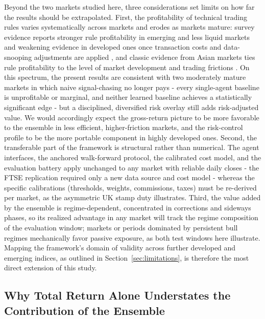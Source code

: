 \documentclass{ieeeaccess}
\begin{document}
Beyond the two markets studied here, three considerations set limits on how far the results should be extrapolated. First, the profitability of technical trading rules varies systematically across markets and erodes as markets mature: survey evidence reports stronger rule profitability in emerging and less liquid markets and weakening evidence in developed ones once transaction costs and data-snooping adjustments are applied \cite{parkirwin2007}, and classic evidence from Asian markets ties rule profitability to the level of market development and trading frictions \cite{bessembinderchan1995}. On this spectrum, the present results are consistent with two moderately mature markets in which naive signal-chasing no longer pays - every single-agent baseline is unprofitable or marginal, and neither learned baseline achieves a statistically significant edge - but a disciplined, diversified risk overlay still adds risk-adjusted value. We would accordingly expect the gross-return picture to be more favorable to the ensemble in less efficient, higher-friction markets, and the risk-control profile to be the more portable component in highly developed ones. Second, the transferable part of the framework is structural rather than numerical. The agent interfaces, the anchored walk-forward protocol, the calibrated cost model, and the evaluation battery apply unchanged to any market with reliable daily closes - the FTSE replication required only a new data source and cost model - whereas the specific calibrations (thresholds, weights, commissions, taxes) must be re-derived per market, as the asymmetric UK stamp duty illustrates. Third, the value added by the ensemble is regime-dependent, concentrated in corrections and sideways phases, so its realized advantage in any market will track the regime composition of the evaluation window; markets or periods dominated by persistent bull regimes mechanically favor passive exposure, as both test windows here illustrate. Mapping the framework's domain of validity across further developed and emerging indices, as outlined in Section~\ref{sec:limitations}, is therefore the most direct extension of this study.

\subsection{Why Total Return Alone Understates the Contribution of the Ensemble}
\end{document}
